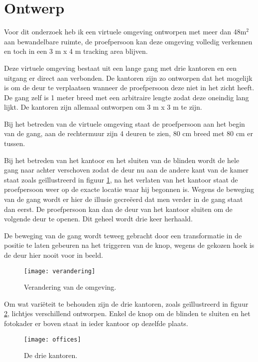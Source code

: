 \section{Ontwerp}
Voor dit onderzoek heb ik een virtuele omgeving ontworpen met meer dan 48m$^2$
aan bewandelbare ruimte, de proefpersoon kan deze omgeving volledig verkennen en
toch in een 3 m x 4 m tracking area blijven.

Deze virtuele omgeving bestaat uit een lange gang met drie kantoren en een 
uitgang er direct aan verbonden. De kantoren zijn zo ontworpen dat het mogelijk 
is om de deur te verplaatsen wanneer de proefpersoon deze niet in het zicht
heeft. De gang zelf is 1 meter breed met een arbitraire lengte zodat deze
oneindig lang lijkt. De kantoren zijn allemaal ontworpen om 3 m x 3 m te zijn.

Bij het betreden van de virtuele omgeving staat de proefpersoon aan het begin van
de gang, aan de rechtermuur zijn 4 deuren te zien, 80 cm breed met 80 cm er
tussen.

Bij het betreden van het kantoor en het sluiten van de blinden wordt de hele 
gang naar achter verschoven zodat de deur nu aan de andere kant van de kamer 
staat zoals ge\"illustreerd in figuur \ref{fig:verandering}, na het verlaten van 
het kantoor staat de proefpersoon weer op de exacte locatie waar hij begonnen is.
Wegens de beweging van de gang wordt er hier de illusie gecre\"eerd dat men
verder in de gang staat dan eerst. De proefpersoon kan dan de deur van het 
kantoor sluiten om de volgende deur te openen. Dit geheel wordt drie keer 
herhaald.

De beweging van de gang wordt teweeg gebracht door een transformatie in de
positie te laten gebeuren na het triggeren van de knop, wegens de gekozen hoek is
de deur hier nooit voor in beeld.

\begin{figure}[h!]
    \centering
    \texttt{[image: verandering]}
    \caption{Verandering van de omgeving.}
    \label{fig:verandering}
\end{figure}

Om wat vari\"eteit te behouden zijn de drie kantoren, zoals ge\"illustreerd 
in figuur \ref{fig:kantoren}, lichtjes verschillend ontworpen. Enkel de knop om 
de blinden te sluiten en het fotokader er boven staat in ieder kantoor op 
dezelfde plaats.

\begin{figure}[h!]
    \centering
    \texttt{[image: offices]}
    \caption{De drie kantoren.}
    \label{fig:kantoren}
\end{figure}

